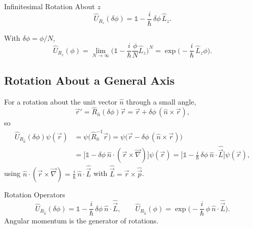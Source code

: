 \documentclass[11pt,a4paper]{article}
\begin{document}
\begin{thm}{Infinitesimal Rotation About $z$}
\[
\hat U_{R_z}(\delta\phi)=\mathbb 1-\frac i\hbar\,\delta\phi\,\hat L_z .
\]
\end{thm}

With $\delta\phi=\phi/N$,
\[
\hat U_{R_z}(\phi)=\lim_{N\to\infty}\Big(\mathbb 1-\frac i\hbar\frac\phi N\hat L_z\Big)^N=\exp\!\Big(-\frac i\hbar\,\hat L_z\phi\Big).
\]

\subsection{Rotation About a General Axis}
For a rotation about the unit vector $\hat n$ through a small angle,
\[
\vec r'=\hat R_{\hat n}(\delta\phi)\vec r=\vec r+\delta\phi\,(\hat n\times\vec r),
\]
so
\begin{align*}
\hat U_{R_{\hat n}}(\delta\phi)\psi(\vec r)&=\psi\big(\hat R_{\hat n}^{-1}\vec r\big)=\psi\big(\vec r-\delta\phi\,(\hat n\times\vec r)\big)\\
&=\Big[\mathbb 1-\delta\phi\ \hat n\cdot(\vec r\times\vec\nabla)\Big]\psi(\vec r)=\Big[\mathbb 1-\frac i\hbar\,\delta\phi\ \hat n\cdot\hat{\vec L}\Big]\psi(\vec r),
\end{align*}
using $\hat n\cdot(\vec r\times\vec\nabla)=\tfrac i\hbar\,\hat n\cdot\hat{\vec L}$ with $\hat{\vec L}=\vec r\times\hat{\vec p}$.

\begin{center}
\end{center}

\begin{thm}{Rotation Operators}
\[
\hat U_{R_{\hat n}}(\delta\phi)=\mathbb 1-\frac i\hbar\,\delta\phi\ \hat n\cdot\hat{\vec L},\qquad
\hat U_{R_{\hat n}}(\phi)=\exp\!\Big(-\frac i\hbar\,\phi\ \hat n\cdot\hat{\vec L}\Big).
\]
Angular momentum is the generator of rotations.
\end{thm}
\end{document}
